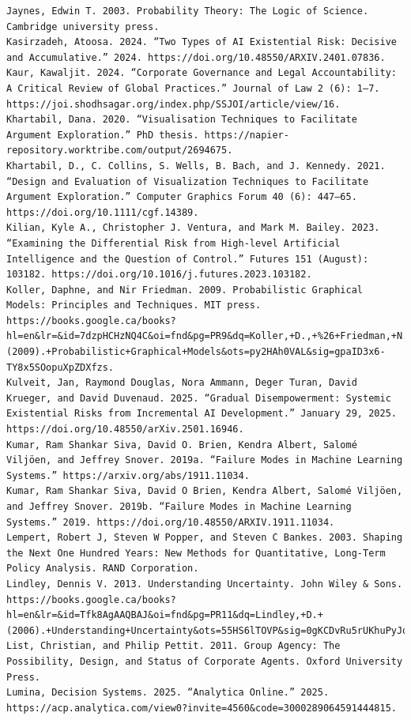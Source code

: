 \documentclass[
  11pt,
  letterpaper,
]{book}
\begin{document}
\begin{verbatim}
Jaynes, Edwin T. 2003. Probability Theory: The Logic of Science. Cambridge university press.
Kasirzadeh, Atoosa. 2024. “Two Types of AI Existential Risk: Decisive and Accumulative.” 2024. https://doi.org/10.48550/ARXIV.2401.07836.
Kaur, Kawaljit. 2024. “Corporate Governance and Legal Accountability: A Critical Review of Global Practices.” Journal of Law 2 (6): 1–7. https://joi.shodhsagar.org/index.php/SSJOI/article/view/16.
Khartabil, Dana. 2020. “Visualisation Techniques to Facilitate Argument Exploration.” PhD thesis. https://napier-repository.worktribe.com/output/2694675.
Khartabil, D., C. Collins, S. Wells, B. Bach, and J. Kennedy. 2021. “Design and Evaluation of Visualization Techniques to Facilitate Argument Exploration.” Computer Graphics Forum 40 (6): 447–65. https://doi.org/10.1111/cgf.14389.
Kilian, Kyle A., Christopher J. Ventura, and Mark M. Bailey. 2023. “Examining the Differential Risk from High-level Artificial Intelligence and the Question of Control.” Futures 151 (August): 103182. https://doi.org/10.1016/j.futures.2023.103182.
Koller, Daphne, and Nir Friedman. 2009. Probabilistic Graphical Models: Principles and Techniques. MIT press. https://books.google.ca/books?hl=en&lr=&id=7dzpHCHzNQ4C&oi=fnd&pg=PR9&dq=Koller,+D.,+%26+Friedman,+N.+(2009).+Probabilistic+Graphical+Models&ots=py2HAh0VAL&sig=gpaID3x6-TY8x5SOopuXpZDXfzs.
Kulveit, Jan, Raymond Douglas, Nora Ammann, Deger Turan, David Krueger, and David Duvenaud. 2025. “Gradual Disempowerment: Systemic Existential Risks from Incremental AI Development.” January 29, 2025. https://doi.org/10.48550/arXiv.2501.16946.
Kumar, Ram Shankar Siva, David O. Brien, Kendra Albert, Salomé Viljöen, and Jeffrey Snover. 2019a. “Failure Modes in Machine Learning Systems.” https://arxiv.org/abs/1911.11034.
Kumar, Ram Shankar Siva, David O Brien, Kendra Albert, Salomé Viljöen, and Jeffrey Snover. 2019b. “Failure Modes in Machine Learning Systems.” 2019. https://doi.org/10.48550/ARXIV.1911.11034.
Lempert, Robert J, Steven W Popper, and Steven C Bankes. 2003. Shaping the Next One Hundred Years: New Methods for Quantitative, Long-Term Policy Analysis. RAND Corporation.
Lindley, Dennis V. 2013. Understanding Uncertainty. John Wiley & Sons. https://books.google.ca/books?hl=en&lr=&id=Tfk8AgAAQBAJ&oi=fnd&pg=PR11&dq=Lindley,+D.+(2006).+Understanding+Uncertainty&ots=55HS6lTOVP&sig=0gKCDvRu5rUKhuPyJqhOzW23upU.
List, Christian, and Philip Pettit. 2011. Group Agency: The Possibility, Design, and Status of Corporate Agents. Oxford University Press.
Lumina, Decision Systems. 2025. “Analytica Online.” 2025. https://acp.analytica.com/view0?invite=4560&code=3000289064591444815.

\end{verbatim}
\end{document}
